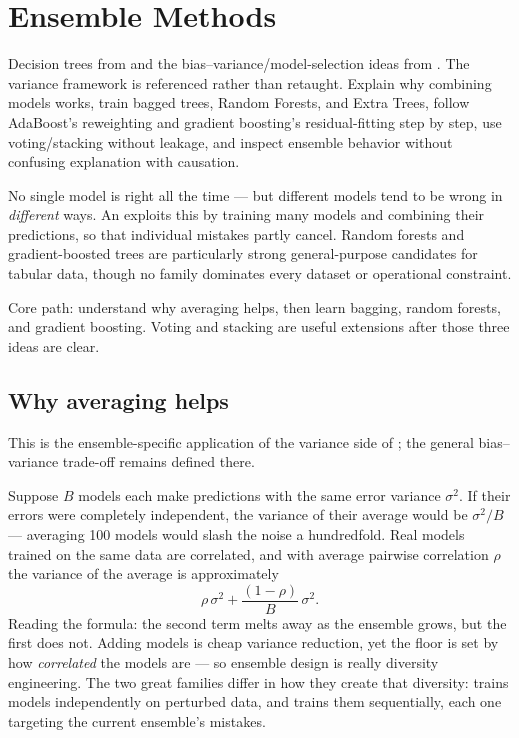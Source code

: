 \chapter{Ensemble Methods}
\label{ch:ensembles}

\chapterguide%
  {Decision trees from  and the bias--variance/model-selection ideas from . The variance framework is referenced rather than retaught.}
  {Explain why combining models works, train bagged trees, Random Forests, and Extra Trees, follow AdaBoost's reweighting and gradient boosting's residual-fitting step by step, use voting/stacking without leakage, and inspect ensemble behavior without confusing explanation with causation.}

No single model is right all the time --- but different models tend to be wrong in \emph{different} ways. An  exploits this by training many models and combining their predictions, so that individual mistakes partly cancel. Random forests and gradient-boosted trees are particularly strong general-purpose candidates for tabular data, though no family dominates every dataset or operational constraint.

\begin{firstread}
Core path: understand why averaging helps, then learn bagging, random forests, and gradient boosting. Voting and stacking are useful extensions after those three ideas are clear.
\end{firstread}

\section{Why averaging helps}

This is the ensemble-specific application of the variance side of ; the general bias--variance trade-off remains defined there.

Suppose $B$ models each make predictions with the same error variance $\sigma^2$. If their errors were completely independent, the variance of their average would be $\sigma^2/B$ --- averaging 100 models would slash the noise a hundredfold. Real models trained on the same data are correlated, and with average pairwise correlation $\rho$ the variance of the average is approximately
\[
  \rho\,\sigma^2+\frac{(1-\rho)}{B}\,\sigma^2 .
\]
Reading the formula: the second term melts away as the ensemble grows, but the first does not. Adding models is cheap variance reduction, yet the floor is set by how \emph{correlated} the models are --- so ensemble design is really diversity engineering. The two great families differ in how they create that diversity:  trains models independently on perturbed data, and  trains them sequentially, each one targeting the current ensemble's mistakes.

